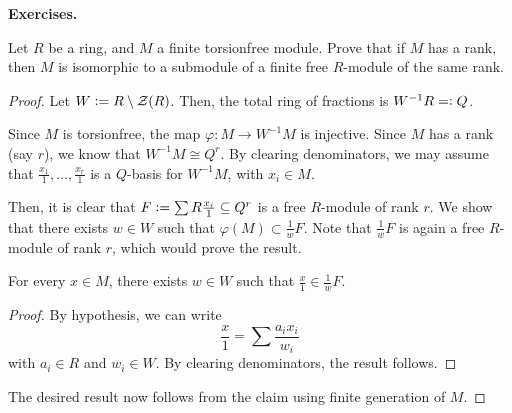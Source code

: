 \documentclass[12pt]{article}
\begin{document}
\textbf{Exercises.}

\begin{exe}
	Let $R$ be a ring, and $M$ a finite torsionfree module. Prove that if $M$ has a rank, then $M$ is isomorphic to a submodule of a finite free $R$-module of the same rank.
\end{exe}
\begin{proof} 
	Let $W \vcentcolon= R \setminus \mathcal{Z}(R)$. Then, the total ring of fractions is $W^{-1}R =\vcentcolon Q$.

	Since $M$ is torsionfree, the map $\varphi : M \to W^{-1} M$ is injective. Since $M$ has a rank (say $r$), we know that $W^{-1} M \cong Q^{r}$. \newline
	By clearing denominators, we may assume that $\frac{x_{1}}{1}, \ldots, \frac{x_{r}}{1}$ is a $Q$-basis for $W^{-1} M$, with $x_{i} \in M$. 

	Then, it is clear that $F \vcentcolon= \sum R \frac{x_{i}}{1} \subset Q^{r}$ is a free $R$-module of rank $r$. We show that there exists $w \in W$ such that $\varphi(M) \subset \frac{1}{w} F$. Note that $\frac{1}{w} F$ is again a free $R$-module of rank $r$, which would prove the result.

	\claim{} For every $x \in M$, there exists $w \in W$ such that $\frac{x}{1} \in \frac{1}{w} F$.
	\begin{proof} 
		By hypothesis, we can write
		\begin{equation*} 
			\frac{x}{1} = \sum \frac{a_{i} x_{i}}{w_{i}}
		\end{equation*}
		with $a_{i} \in R$ and $w_{i} \in W$. By clearing denominators, the result follows.
	\end{proof}

	The desired result now follows from the claim using finite generation of $M$.
\end{proof}
\end{document}
